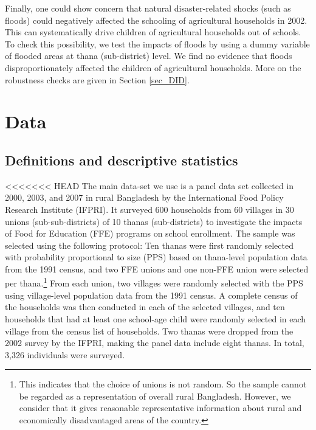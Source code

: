 \documentclass[12pt,letterpaper]{article}
\newcommand{\0}{\ensuremath{\mbox{\boldmath $0$}}}
\begin{document}
Finally, one could show concern that natural disaster-related shocks (such as floods) could negatively affected the schooling of agricultural households in 2002. This can systematically drive children of agricultural households out of schools. To check this possibility, we test the impacts of floods by using a dummy variable of flooded areas at thana (sub-district) level. We find no evidence that floods disproportionately affected the children of agricultural households. More on the robustness checks are given in Section \ref{sec_DID}. 

\section{Data} 
\subsection{Definitions and descriptive statistics}

<<<<<<< HEAD
The main data-set we use is a panel data set collected in 2000, 2003, and 2007 in rural Bangladesh by the International Food Policy Research Institute (IFPRI). It surveyed 600 households from 60 villages in 30 unions (sub-sub-districts) of 10 thanas (sub-districts) to investigate the impacts of Food for Education (FFE) programs on school enrollment. The sample was selected using the following protocol: Ten thanas were first randomly selected with probability proportional to size (PPS) based on thana-level population data from the 1991 census, and two FFE unions and one non-FFE union were selected per thana.\footnote{This indicates that the choice of unions is not random. So the sample cannot be regarded as a representation of overall rural Bangladesh. However, we consider that it gives reasonable representative information about rural and economically disadvantaged areas of the country. } From each union, two villages were randomly selected with the PPS using village-level population data from the 1991 census. A complete census of the households was then conducted in each of the selected villages, and ten households that had at least one school-age child were randomly selected in each village from the census list of households. Two thanas were dropped from the 2002 survey by the IFPRI, making the panel data include eight thanas. In total, 3,326 individuals were surveyed. 
\end{document}
